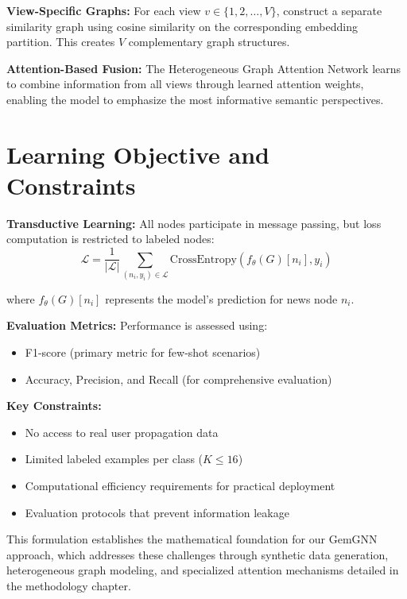 \textbf{View-Specific Graphs:} For each view $v \in \{1, 2, \ldots, V\}$, construct a separate similarity graph using cosine similarity on the corresponding embedding partition. This creates $V$ complementary graph structures.

\textbf{Attention-Based Fusion:} The Heterogeneous Graph Attention Network learns to combine information from all views through learned attention weights, enabling the model to emphasize the most informative semantic perspectives.

\section{Learning Objective and Constraints}

\textbf{Transductive Learning:} All nodes participate in message passing, but loss computation is restricted to labeled nodes:
\begin{equation}
\mathcal{L} = \frac{1}{|\mathcal{L}|} \sum_{(n_i, y_i) \in \mathcal{L}} \text{CrossEntropy}(f_\theta(G)[n_i], y_i)
\end{equation}

where $f_\theta(G)[n_i]$ represents the model's prediction for news node $n_i$.

\textbf{Evaluation Metrics:} Performance is assessed using:
\begin{itemize}
\item F1-score (primary metric for few-shot scenarios)
\item Accuracy, Precision, and Recall (for comprehensive evaluation)
\end{itemize}

\textbf{Key Constraints:}
\begin{itemize}
\item No access to real user propagation data
\item Limited labeled examples per class ($K \leq 16$)
\item Computational efficiency requirements for practical deployment
\item Evaluation protocols that prevent information leakage
\end{itemize}

This formulation establishes the mathematical foundation for our GemGNN approach, which addresses these challenges through synthetic data generation, heterogeneous graph modeling, and specialized attention mechanisms detailed in the methodology chapter.

\EndChapter
